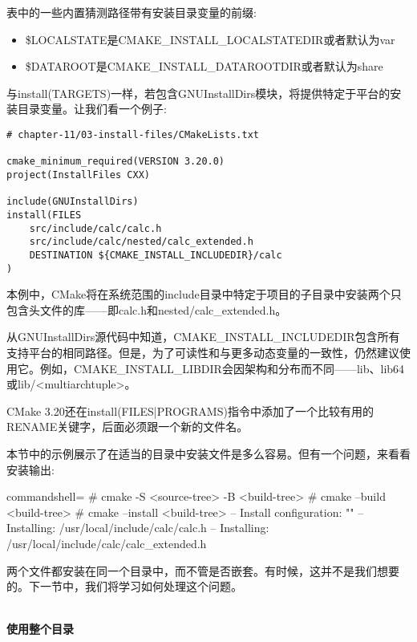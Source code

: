 表中的一些内置猜测路径带有安装目录变量的前缀:

\begin{itemize}
\item 
\$LOCALSTATE是CMAKE\_INSTALL\_LOCALSTATEDIR或者默认为var

\item 
\$DATAROOT是CMAKE\_INSTALL\_DATAROOTDIR或者默认为share
\end{itemize}

与install(TARGETS)一样，若包含GNUInstallDirs模块，将提供特定于平台的安装目录变量。让我们看一个例子:

\begin{lstlisting}[style=styleCMake]
# chapter-11/03-install-files/CMakeLists.txt

cmake_minimum_required(VERSION 3.20.0)
project(InstallFiles CXX)

include(GNUInstallDirs)
install(FILES
	src/include/calc/calc.h
	src/include/calc/nested/calc_extended.h
	DESTINATION ${CMAKE_INSTALL_INCLUDEDIR}/calc
)
\end{lstlisting}

本例中，CMake将在系统范围的include目录中特定于项目的子目录中安装两个只包含头文件的库——即calc.h和nested/calc\_extended.h。

\begin{tcolorbox}[colback=blue!5!white,colframe=blue!75!black,title=Note]
从GNUInstallDirs源代码中知道，CMAKE\_INSTALL\_INCLUDEDIR包含所有支持平台的相同路径。但是，为了可读性和与更多动态变量的一致性，仍然建议使用它。例如，CMAKE\_INSTALL\_LIBDIR会因架构和分布而不同——lib、lib64或lib/<multiarchtuple>。
\end{tcolorbox}

CMake 3.20还在install(FILES|PROGRAMS)指令中添加了一个比较有用的RENAME关键字，后面必须跟一个新的文件名。

本节中的示例展示了在适当的目录中安装文件是多么容易。但有一个问题，来看看安装输出:

\begin{tcblisting}{commandshell={}}
# cmake -S <source-tree> -B <build-tree>
# cmake --build <build-tree>
# cmake --install <build-tree>
-- Install configuration: ""
-- Installing: /usr/local/include/calc/calc.h
-- Installing: /usr/local/include/calc/calc_extended.h
\end{tcblisting}

两个文件都安装在同一个目录中，而不管是否嵌套。有时候，这并不是我们想要的。下一节中，我们将学习如何处理这个问题。


\hspace*{\fill} \\ %
\noindent
\textbf{使用整个目录}

